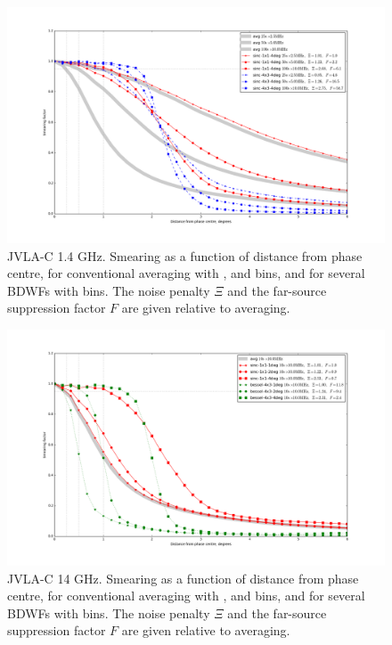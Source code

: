 \documentclass[useAMS,usenatbib]{mn2e}
\begin{document}
\begin{figure}
\includegraphics[width=.9\textwidth]{./Figures/suppression-25-100-sincs.png}
\caption{JVLA-C 1.4 GHz. Smearing as a function of distance from phase centre, for conventional averaging with 
,  and  bins, and for several BDWFs with  bins.
The noise penalty $\Xi$ and the far-source suppression factor $F$ are given relative to 
averaging.}
\label{fig:results-3sincs}
\end{figure}
\begin{figure}
\includegraphics[width=.9\textwidth]{./Figures/suppression-14GHz.png}
\caption{JVLA-C 14 GHz. Smearing as a function of distance from phase centre, for conventional averaging with 
,  and  bins, and for several BDWFs with  bins.
The noise penalty $\Xi$ and the far-source suppression factor $F$ are given relative to 
averaging.}
\label{fig:results-14ghz}
\end{figure}
\end{document}
